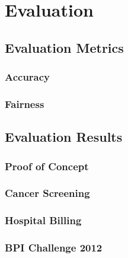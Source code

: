 %
\chapter{Evaluation}

\section{Evaluation Metrics}

\subsection*{Accuracy}

\subsection*{Fairness}


\section{Evaluation Results}

\subsection{Proof of Concept}

\subsection{Cancer Screening}

\subsection{Hospital Billing}

\subsection{BPI Challenge 2012}